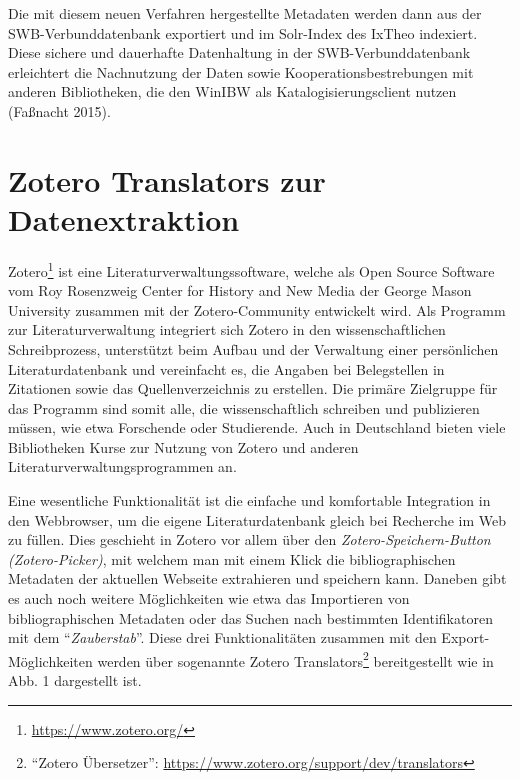 \documentclass[a4paper,
fontsize=11pt,
oneside,
numbers=noperiodatend,
parskip=half-,
bibliography=totoc,
final
]{scrartcl}
\begin{document}
Die mit diesem neuen Verfahren hergestellte Metadaten werden dann aus
der SWB-Ver\-bund\-daten\-bank exportiert und im Solr-Index des IxTheo
indexiert. Diese sichere und dauerhafte Datenhaltung in der
SWB-Ver\-bund\-daten\-bank erleichtert die Nachnutzung der Daten sowie
Kooperationsbestrebungen mit anderen Bibliotheken, die den WinIBW als
Katalogisierungsclient nutzen (Faßnacht 2015).

\section*{Zotero Translators zur
Datenextraktion}\label{zotero-translators-zur-datenextraktion}

Zotero\footnote{\url{https://www.zotero.org/}} ist eine
Literaturverwaltungssoftware, welche als Open Source Software vom Roy
Rosenzweig Center for History and New Media der George Mason University
zusammen mit der Zotero-Community entwickelt wird. Als Programm zur
Literaturverwaltung integriert sich Zotero in den wissenschaftlichen
Schreibprozess, unterstützt beim Aufbau und der Verwaltung einer
persönlichen Literaturdatenbank und vereinfacht es, die Angaben bei
Belegstellen in Zitationen sowie das Quellenverzeichnis zu erstellen.
Die primäre Zielgruppe für das Programm sind somit alle, die
wissenschaftlich schreiben und publizieren müssen, wie etwa Forschende
oder Studierende. Auch in Deutschland bieten viele Bibliotheken Kurse
zur Nutzung von Zotero und anderen Literaturverwaltungsprogrammen an.

Eine wesentliche Funktionalität ist die einfache und komfortable
Integration in den Webbrowser, um die eigene Literaturdatenbank gleich
bei Recherche im Web zu füllen. Dies geschieht in Zotero vor allem über
den \emph{Zotero-Speichern-Button (Zotero-Picker)}, mit welchem man mit
einem Klick die bibliographischen Metadaten der aktuellen Webseite
extrahieren und speichern kann. Daneben gibt es auch noch weitere
Möglichkeiten wie etwa das Im\-portieren von bibliographischen Metadaten
oder das Suchen nach bestimmten Identifikatoren mit dem
\enquote{\emph{Zauberstab}}. Diese drei Funktionalitäten zusammen mit
den Export-Möglichkeiten werden über sogenannte Zotero
Translators\footnote{\enquote{Zotero Übersetzer}:
  \url{https://www.zotero.org/support/dev/translators}} bereitgestellt
wie in Abb. 1 dargestellt ist.
\end{document}
